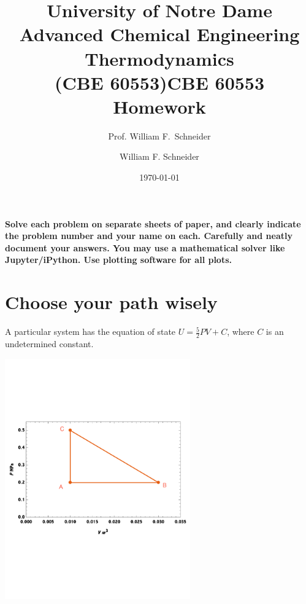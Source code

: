 \documentclass[11pt]{article}
\title{University of Notre Dame\\Advanced Chemical Engineering Thermodynamics\\(CBE 60553)}
\author{Prof. William F.\ Schneider}
\author{William F. Schneider}
\date{\today}
\title{CBE 60553 Homework}
\begin{document}
\begin{OPTIONS}
\end{OPTIONS}

\noindent \textbf{Solve each problem on separate sheets of paper, and clearly indicate the problem number and your name on each.  Carefully and neatly document your answers.  You may use a mathematical solver like Jupyter/iPython. Use plotting software for all plots.}

\section{Choose your path wisely}
\label{sec:org914033e}
A particular system has the equation of state \(U = \frac{5}{2} PV + C\), where \(C\) is an undetermined constant.

\begin{center}
\begin{center}
\includegraphics[width=0.6\textwidth]{./Figure1-annotated.pdf}
\end{center}
\end{center}
\end{document}

